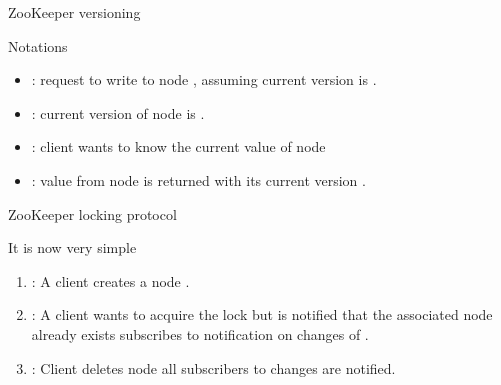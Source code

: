 \begin{slide}{ZooKeeper versioning}
  \begin{centerfig}
  \end{centerfig}

  \begin{block}{Notations}
    \begin{itemize}\firmlist
    \item {}: request to write  to node , assuming current version is .
    \item {}: current version of node  is . 
    \item {}: client wants to know the current value of node 
    \item {}: value  from node  is returned with its current version .
    \end{itemize}
  \end{block}
\end{slide}
\begin{slide}{ZooKeeper locking protocol}
  \begin{block}{It is now very simple}
    \begin{enumerate}\firmlist
    \item {}: A client  creates a node .
    \item {}: A client  wants to acquire the lock but is notified that the associated node
      already exists \mathexpr{\Rightarrow}  subscribes to notification on changes of .
    \item {}: Client  deletes node  \mathexpr{\Rightarrow} all subscribers to
      changes are notified.
    \end{enumerate}

    
  \end{block}
\end{slide}
